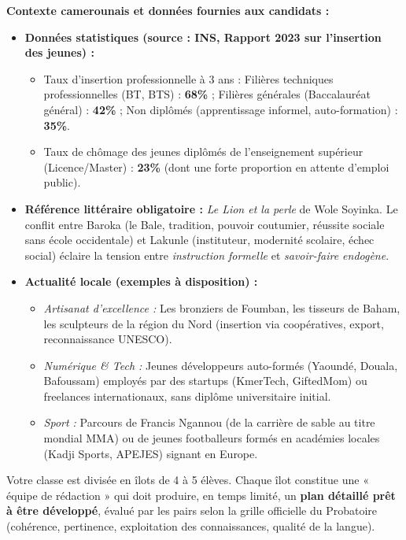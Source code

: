 \documentclass[11pt]{article}
\begin{document}
\vspace{0.5em}
\noindent
\textbf{Contexte camerounais et données fournies aux candidats :}
\begin{itemize}
    \item \textbf{Données statistiques (source : INS, Rapport 2023 sur l'insertion des jeunes) :}
    \begin{itemize}
        \item Taux d'insertion professionnelle à 3 ans : Filières techniques professionnelles (BT, BTS) : \textbf{68\%} ; Filières générales (Baccalauréat général) : \textbf{42\%} ; Non diplômés (apprentissage informel, auto-formation) : \textbf{35\%}.
        \item Taux de chômage des jeunes diplômés de l'enseignement supérieur (Licence/Master) : \textbf{23\%} (dont une forte proportion en attente d'emploi public).
    \end{itemize}
    \item \textbf{Référence littéraire obligatoire :} \emph{Le Lion et la perle} de Wole Soyinka. Le conflit entre Baroka (le Bale, tradition, pouvoir coutumier, réussite sociale sans école occidentale) et Lakunle (instituteur, modernité scolaire, échec social) éclaire la tension entre \emph{instruction formelle} et \emph{savoir-faire endogène}.
    \item \textbf{Actualité locale (exemples à disposition) :}
    \begin{itemize}
        \item \textit{Artisanat d'excellence :} Les bronziers de Foumban, les tisseurs de Baham, les sculpteurs de la région du Nord (insertion via coopératives, export, reconnaissance UNESCO).
        \item \textit{Numérique \& Tech :} Jeunes développeurs auto-formés (Yaoundé, Douala, Bafoussam) employés par des startups (KmerTech, GiftedMom) ou freelances internationaux, sans diplôme universitaire initial.
        \item \textit{Sport :} Parcours de Francis Ngannou (de la carrière de sable au titre mondial MMA) ou de jeunes footballeurs formés en académies locales (Kadji Sports, APEJES) signant en Europe.
    \end{itemize}
\end{itemize}

\vspace{0.5em}
\noindent
Votre classe est divisée en îlots de 4 à 5 élèves. Chaque îlot constitue une « équipe de rédaction » qui doit produire, en temps limité, un \textbf{plan détaillé prêt à être développé}, évalué par les pairs selon la grille officielle du Probatoire (cohérence, pertinence, exploitation des connaissances, qualité de la langue).
\end{document}
